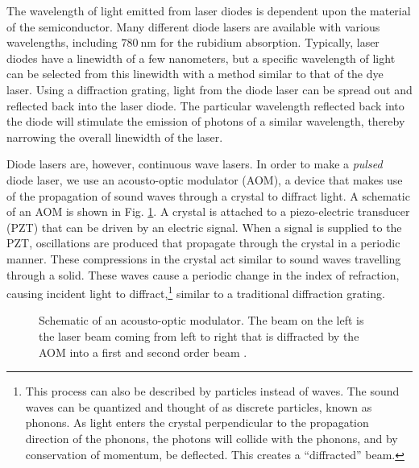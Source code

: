 The wavelength of light emitted from laser diodes is dependent upon the material of the semiconductor. Many different diode lasers are available with various wavelengths, including $\SI{780}{\nano\meter}$ for the rubidium absorption. Typically, laser diodes have a linewidth of a few nanometers, but a specific wavelength of light can be selected from this linewidth with a method similar to that of the dye laser. Using a diffraction grating, light from the diode laser can be spread out and reflected back into the laser diode. The particular wavelength reflected back into the diode will stimulate the emission of photons of a similar wavelength, thereby narrowing the overall linewidth of the laser.

Diode lasers are, however, continuous wave lasers. In order to make a \textit{pulsed} diode laser, we use an acousto-optic modulator (AOM), a device that makes use of the propagation of sound waves through a crystal to diffract light. A schematic of an AOM is shown in Fig. \ref{fig:AOM1}. A crystal is attached to a piezo-electric transducer (PZT) that can be driven by an electric signal. When a signal is supplied to the PZT, oscillations are produced that propagate through the crystal in a periodic manner. These  compressions in the crystal act similar to sound waves travelling through a solid. These waves cause a periodic change in the index of refraction, causing incident light to diffract,\footnote{This process can also be described by particles instead of waves. The sound waves can be quantized and thought of as discrete particles, known as phonons. As light enters the crystal perpendicular to the propagation direction of the phonons, the photons will collide with the phonons, and by conservation of momentum, be deflected. This creates a ``diffracted'' beam.} similar to a traditional diffraction grating.


\begin{figure}[h]
		\centering
		
		\caption{Schematic of an acousto-optic modulator. The beam on the left is the laser beam coming from left to right that is diffracted by the AOM into a first and second order beam \protect\cite{aomfig}.}
		\label{fig:AOM1}
\end{figure}

